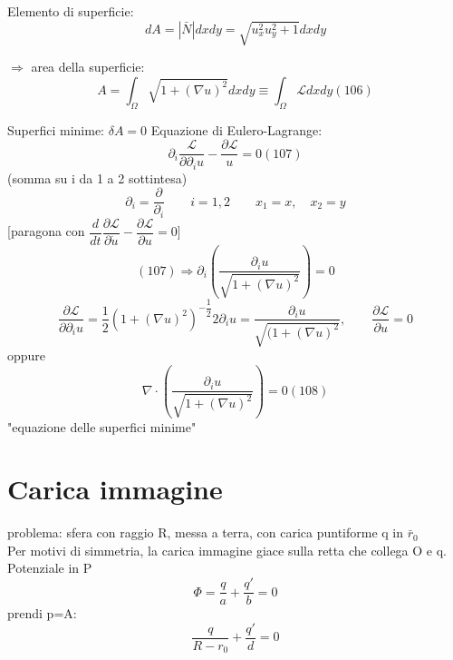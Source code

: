 \documentclass[a4paper,11pt]{report}
\begin{document}
Elemento di superficie:
$$
dA = |\bar{N}|dxdy=\sqrt{u_x^2 u_y^2 +1}dxdy 
$$

$\Rightarrow$ area della superficie:
\begin{equation}
A=\int_{\Omega} \sqrt{1+(\nabla u)^2} dxdy\equiv \int_{\Omega} \mathcal{L}dxdy (106)
\end{equation}

Superfici minime: $\delta A=0$
Equazione di Eulero-Lagrange:
\begin{equation}
\partial_i \dfrac{\mathcal{L}}{\partial \partial_i u}-\dfrac{\partial \mathcal{L}}{u}=0 (107)
\end{equation}
(somma su i da 1 a 2 sottintesa)
$$
\partial_i=\dfrac{\partial}{\partial_i} \qquad i=1,2 \qquad x_1=x,\quad x_2=y
$$
[paragona con $\dfrac{d}{dt}\dfrac{\partial \mathcal{L}}{\partial \dot{u}}-\dfrac{\partial\mathcal{L}}{\partial u}=0$]
$$
(107)\Rightarrow \partial_i \left( \dfrac{\partial_i u}{\sqrt{1+(\nabla u)^2}}\right)=0
$$
$$
\dfrac{\partial\mathcal{L}}{\partial \partial_i u} = \dfrac{1}{2}(1 +(\nabla u)^2)^{-\dfrac{1}{2}} 2\partial_i u=\dfrac{\partial_i u}{\sqrt{(1+(\nabla u)^2}}, \qquad \dfrac{\partial \mathcal{L}}{\partial u}=0 
$$
oppure
\begin{equation}
\nabla \cdot \left( \dfrac{\partial_i u}{\sqrt{1+(\nabla u)^2}}\right)=0 (108)
\end{equation}
"equazione delle superfici minime"














\chapter{Carica immagine}
problema: sfera con raggio R, messa a terra, con carica puntiforme q in $\bar{r}_0$\\

Per motivi di simmetria, la carica immagine giace sulla retta che collega O e q.\\
Potenziale in P
\begin{equation}
\Phi = \dfrac{q}{a}+\dfrac{q'}{b} = 0
\end{equation}
prendi p=A:
\begin{equation}
\dfrac{q}{R-r_0} + \dfrac{q'}{d}=0
\end{equation}
\end{document}
